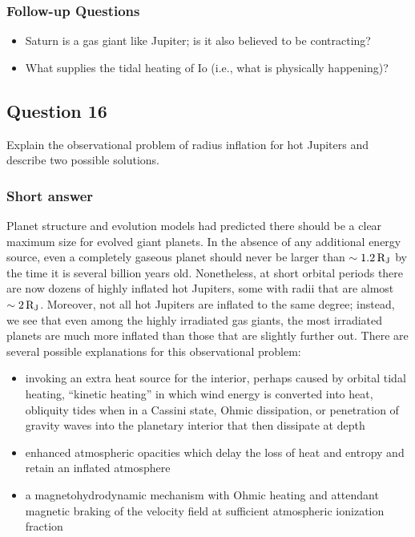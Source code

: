 \documentclass[a4paper,10pt]{article}
\begin{document}
\subsubsection{Follow-up Questions}

\begin{itemize}
    \item Saturn is a gas giant like Jupiter; is it also believed to be contracting?
    \item What supplies the tidal heating of Io (i.e., what is physically happening)?
\end{itemize}



\newpage
\subsection{Question 16}

Explain the observational problem of radius inflation for hot Jupiters and describe two possible solutions.

\subsubsection{Short answer}

Planet structure and evolution models had predicted there should be a clear maximum size for evolved giant planets. In the absence of any additional energy source, even a completely gaseous planet should never be larger than $\sim1.2\,{\rm R_J}$ by the time it is several billion years old. Nonetheless, at short orbital periods there are now dozens of highly inflated hot Jupiters, some with radii that are almost $\sim2\,{\rm R_J}$. Moreover, not all hot Jupiters are inflated to the same degree; instead, we see that even among the highly irradiated gas giants, the most irradiated planets are much more inflated than those that are slightly further out. There are several possible explanations for this observational problem:

\begin{itemize}
    \item invoking an extra heat source for the interior, perhaps caused by orbital tidal heating, ``kinetic heating'' in which wind energy is converted into heat, obliquity tides when in a Cassini state, Ohmic dissipation, or penetration of gravity waves into the planetary interior that then dissipate at depth
    \item enhanced atmospheric opacities which delay the loss of heat and entropy and retain an inflated atmosphere
    \item a magnetohydrodynamic mechanism with Ohmic heating and attendant magnetic braking of the velocity field at sufficient atmospheric ionization fraction
\end{itemize}
\end{document}
